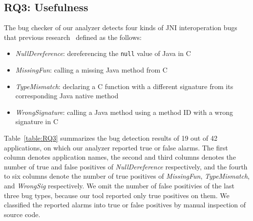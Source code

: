 

\subsection{RQ3: Usefulness}

The bug checker of our analyzer detects four kinds of JNI interoperation bugs
that previous research~\cite{ILEA, LeeASE20} defined as the follows:


\begin{itemize}
  \item {\it NullDereference}: dereferencing the {\tt null} value of Java in C
  \item {\it MissingFun}: calling a missing Java method from C
  \item {\it TypeMismatch}: declaring a C function with a different signature
    from its corresponding Java native method
  \item {\it WrongSignature}: calling a Java method using a method ID with a
    wrong signature in C
\end{itemize}

Table~\ref{table:RQ3} summarizes the bug detection results of 19 out of 42
applications, on which our analyzer reported true or false alarms.  The first
column denotes application names, the second and third columns denotes the
number of true and false positives of {\it NullDereference} respectively, and
the fourth to six columns denote the number of true positives of {\it
MissingFun}, {\it TypeMismatch}, and {\it WrongSig} respectively. We omit the
number of false positivies of the last three bug types, because our tool
reported only true positives on them. We classified the reported alarms into
true or false positives by manual inspection of source code. 



